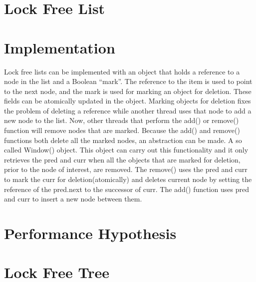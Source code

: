 \documentclass[10pt,a4paper]{article}
\begin{document}

\section{Lock Free List} \section{Implementation} Lock free lists can be
implemented with an object that holds a reference to a node in the list and a
Boolean ``mark''. The reference to the item is used to point to the next node,
and the mark is used for marking an object for deletion. These fields can be
atomically updated in the object. Marking objects for deletion fixes the
problem of deleting a reference while another thread uses that node to add a
new node to the list. Now, other threads that perform the add() or remove()
function will remove nodes that are marked. Because the add() and remove()
functions both delete all the marked nodes, an abstraction can be made. A so
called Window() object. This object can carry out this functionality and it
only retrieves the pred and curr when all the objects that are marked for
deletion, prior to the node of interest, are removed. The remove() uses the
pred and curr to mark the curr for deletion(atomically) and deletes current
node by setting the reference of the pred.next to the successor of curr. The
add() function uses pred and curr to insert a new node between them.

\section{Performance Hypothesis}


\section{Lock Free Tree}
\end{document}
